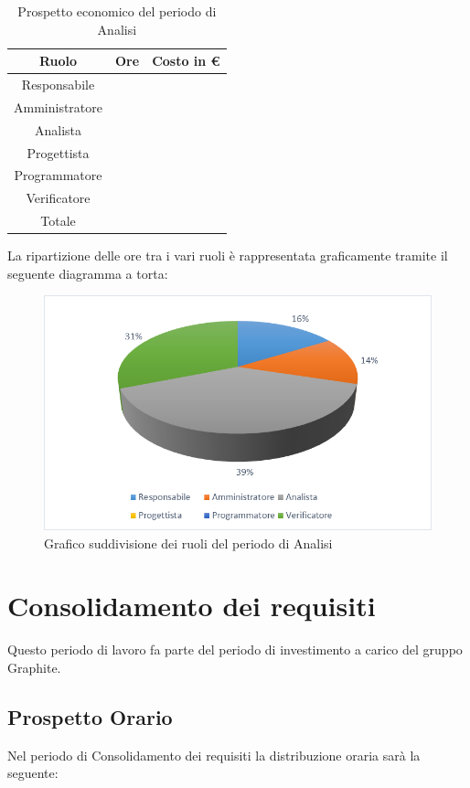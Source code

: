 \documentclass[./PianodiProgetto.tex]{subfiles}
\begin{document}
\begin{table}[H]
	\centering
	\begin{tabular}{|c|c|c|}
		\hline
		Ruolo&Ore&Costo in € \\ \hline
		Responsabile& &  \\ \hline
		Amministratore& &  \\ \hline
		Analista& &  \\ \hline
		Progettista& &  \\ \hline
		Programmatore& &  \\ \hline
		Verificatore& &  \\ \hline
		Totale& & \\ \hline
	\end{tabular}
	\caption{Prospetto economico del periodo di Analisi}
\end{table}

La ripartizione delle ore tra i vari ruoli è rappresentata graficamente tramite il seguente diagramma a torta:

\begin{figure}[H]
	\centering
	\includegraphics[width=1\linewidth]{img/grafici/AnalisiProspettoEconomico}
	\caption{Grafico suddivisione dei ruoli del periodo di Analisi}
	\label{fig:analisi-prospetto-economico}
\end{figure}


\section{Consolidamento dei requisiti}
Questo periodo di lavoro fa parte del periodo di investimento a carico del gruppo Graphite.
\subsection{Prospetto Orario}
Nel periodo di Consolidamento dei requisiti la distribuzione oraria sarà la seguente:
\end{document}
